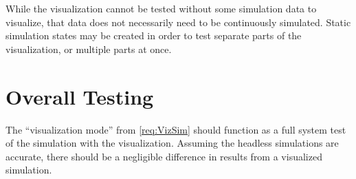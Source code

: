 While the visualization cannot be tested without some simulation data to visualize, that data does not necessarily need to be continuously simulated.
Static simulation states may be created in order to test separate parts of the visualization, or multiple parts at once.\label{sec:TestsForViz}

\section{Overall Testing}
The ``visualization mode'' from \cref{req:VizSim} should function as a full system test of the simulation with the visualization.
Assuming the headless simulations are accurate, there should be a negligible difference in results from a visualized simulation.
